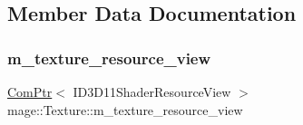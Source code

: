 \subsection{Member Data Documentation}
\hypertarget{classmage_1_1_texture_a3de1d2d744e7bb276b0f66d72640e423}{}\label{classmage_1_1_texture_a3de1d2d744e7bb276b0f66d72640e423} 
\subsubsection{\texorpdfstring{m\+\_\+texture\+\_\+resource\+\_\+view}{m\_texture\_resource\_view}}
{\footnotesize\ttfamily \hyperlink{namespacemage_ae74f374780900893caa5555d1031fd79}{Com\+Ptr}$<$ I\+D3\+D11\+Shader\+Resource\+View $>$ mage\+::\+Texture\+::m\+\_\+texture\+\_\+resource\+\_\+view\hspace{0.3cm}{\ttfamily [private]}}

